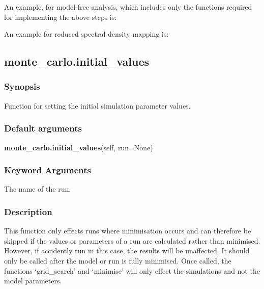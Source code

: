 An example, for model-free analysis, which includes only the functions required for
implementing the above steps is:




An example for reduced spectral density mapping is:





\newpage

\subsection{monte\_carlo.initial\_values}


\subsubsection{Synopsis}

Function for setting the initial simulation parameter values.

\subsubsection{Default arguments}

\textsf{\textbf{monte\_carlo.initial\_values}(self, run=None)}


\subsubsection{Keyword Arguments}

  The name of the run.

\subsubsection{Description}

This function only effects runs where minimisation occurs and can therefore be skipped if
the values or parameters of a run are calculated rather than minimised.  However, if
accidently run in this case, the results will be unaffected.  It should only be called after
the model or run is fully minimised.  Once called, the functions `grid\_search' and
`minimise' will only effect the simulations and not the model parameters.

